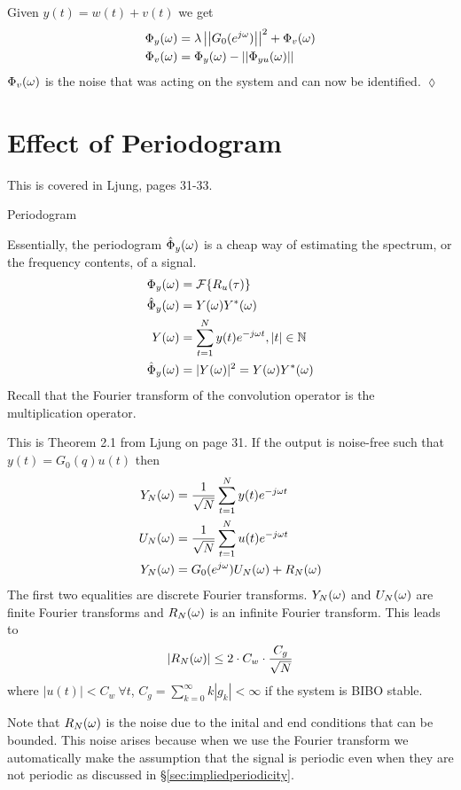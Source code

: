 \begin{example}
Given $y(t)=w(t)+v(t)$ we get
\begin{align*}
\Phi_y(\omega) &= \lambda\left|\left|G_0(e^{j\omega})\right|\right|^2 + \Phi_v(\omega) \\
\Phi_v(\omega) &= \Phi_y(\omega) - \left|\left|\Phi_{yu}(\omega)\right|\right|
\end{align*}
$\Phi_v(\omega)$ is the noise that was acting on the system and can now be identified.
$\lozenge$
\end{example}

\section{Effect of Periodogram}
This is covered in Ljung, pages 31-33.%
\begin{definition}{Periodogram}

Essentially, the periodogram $\hat{\Phi}_y(\omega)$ is a cheap way of estimating the spectrum, or the frequency contents, of a signal.
\begin{align*}
\Phi_y(\omega) &= \mathcal{F}\{R_u(\tau)\} \\
\hat{\Phi}_y(\omega) &= Y(\omega)Y^\ast(\omega) \\
Y(\omega) &= \sum_{t=1}^N y(t)e^{-j\omega t}, |t|\in\mathbb{N} \\
\hat{\Phi}_y(\omega) &= |Y(\omega)|^2 = Y(\omega)Y^\ast(\omega)
\end{align*}
Recall that the Fourier transform of the convolution operator is the multiplication operator.
\end{definition}

\begin{theorem}
This is Theorem 2.1 from Ljung on page 31.
If the output is noise-free such that $y(t)=G_0(q)u(t)$ then
\begin{align*}
Y_N(\omega) &= \frac{1}{\sqrt{N}}\sum_{t=1}^N y(t)e^{-j\omega t} \\
U_N(\omega) &= \frac{1}{\sqrt{N}}\sum_{t=1}^N u(t)e^{-j\omega t} \\
Y_N(\omega) &= G_0(e^{j\omega})U_N(\omega) + R_N(\omega)
\end{align*}
The first two equalities are discrete Fourier transforms.
$Y_N(\omega)$ and $U_N(\omega)$ are finite Fourier transforms and $R_N(\omega)$ is an infinite Fourier transform.
This leads to
$$|R_N(\omega)| \leq 2\cdot C_w\cdot \frac{C_g}{\sqrt{N}}$$
where $|u(t)|<C_w~\forall t$, $C_g=\sum_{k=0}^\infty k|g_k|<\infty$ if the system is BIBO stable.
\end{theorem}
Note that $R_N(\omega)$ is the noise due to the inital and end conditions that can be bounded.
This noise arises because when we use the Fourier transform we automatically make the assumption that the signal is periodic even when they are not periodic as discussed in \S\ref{sec:impliedperiodicity}.
